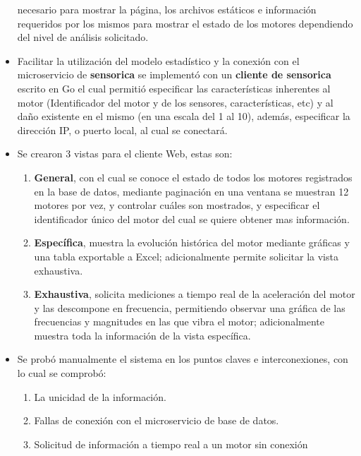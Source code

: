\begin{itemize}
        necesario para mostrar la página, los archivos estáticos e
        información requeridos por los mismos para mostrar el estado de los motores
        dependiendo del nivel de análisis solicitado.
    \item Facilitar la utilización del modelo estadístico y la conexión con
        el microservicio de \textbf{sensorica} se implementó con un \textbf{cliente de
        sensorica} escrito en Go el cual permitió especificar las características
        inherentes al motor (Identificador del motor y de los sensores, características, etc)
        y al daño existente en el mismo (en una escala del 1 al 10), además,
        especificar la dirección IP, o puerto local, al cual se conectará.
    \item Se crearon 3 vistas para el cliente Web, estas son:
        \begin{enumerate}
            \item \textbf{General}, con el cual se conoce el estado de todos
                los motores registrados en la base de datos, mediante paginación
                en una ventana se muestran 12 motores por vez, y controlar
                cuáles son mostrados,
                y especificar el identificador
                único del motor del cual se quiere obtener mas información.
            \item \textbf{Específica},
                muestra la evolución histórica del motor mediante gráficas
                y una tabla exportable a Excel; adicionalmente permite solicitar
                la vista exhaustiva.
            \item \textbf{Exhaustiva},
                solicita mediciones a tiempo real de la aceleración del motor
                y las descompone en frecuencia, permitiendo observar una gráfica
                de las frecuencias y magnitudes  en las que vibra
                el motor; adicionalmente muestra toda la información de la
                vista específica.
        \end{enumerate}
    \item Se probó manualmente el sistema en los puntos claves
        e interconexiones, con lo cual  se comprobó:
        \begin{enumerate}
            \item La unicidad de la información.
            \item Fallas de conexión con el microservicio de base de datos.
            \item Solicitud de información a tiempo real a un motor sin conexión

\end{enumerate}
\end{itemize}
